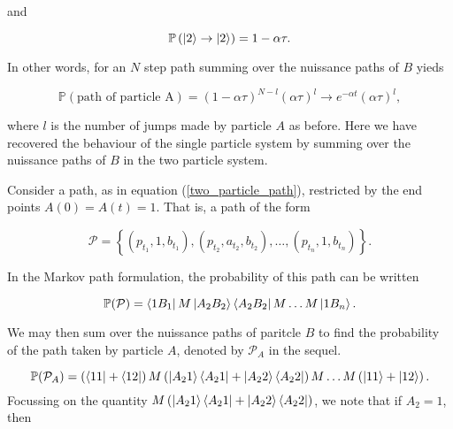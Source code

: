 \documentclass{article}
\begin{document}
and

\begin{equation}
  \mathbb{P}\left(\ket{2} \rightarrow \ket{2}\right) = 1- \alpha \tau.
\end{equation}

In other words, for an $N$ step path summing over the nuissance paths of $B$ yieds

\begin{equation}
  \mathbb{P}(\text{path of particle A}) = (1-\alpha\tau)^{N-l}(\alpha\tau)^l \rightarrow e^{-\alpha t}(\alpha \tau)^l,
\end{equation}

where $l$ is the number of jumps made by particle $A$ as before. Here we have recovered the behaviour of the single particle system by summing over the nuissance paths of $B$ in the two particle system.

Consider a path, as in equation (\ref{two_particle_path}), restricted by the end points $A(0) = A(t) = 1$. That is, a path of the form

\begin{equation}\label{}
  \mathcal{P} = \left \{ (p_{t_1}, 1, b_{t_1}), (p_{t_2}, a_{t_2}, b_{t_2}), \ldots, (p_{t_n}, 1, b_{t_n}) \right \}.
\end{equation}

In the Markov path formulation, the probability of this path can be written

\begin{equation}
\mathbb{P}(\mathcal{P}) =   \bra{1B_1}M\ket{A_2B_2}\bra{A_2B_2}M\ldots M\ket{1B_n}.
\end{equation}

We may then sum over the nuissance paths of paritcle $B$ to find the probability of the path taken by particle $A$, denoted by $\mathcal{P}_A$ in the sequel.

\begin{equation}
  \mathbb{P}(\mathcal{P}_A) = \left(\bra{11}+\bra{12}\right) M \left(\ket{A_21}\bra{A_21}+\ket{A_22}\bra{A_22}\right)M \ldots M \left(\ket{11}+\ket{12}\right).
\end{equation}
Focussing on the quantity $M\left(\ket{A_21}\bra{A_21}+\ket{A_22}\bra{A_22}\right)$, we note that if $A_2 = 1$, then
\end{document}
